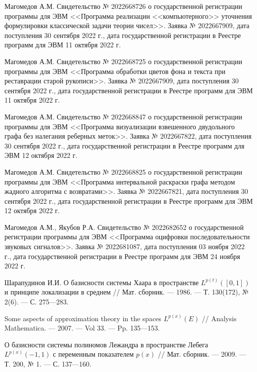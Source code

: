 \begin{thebibliography}{111}
Магомедов А.М. 
Свидетельство № 2022668726 о государственной регистрации программы для ЭВМ <<Программа реализации <<компьютерного>> уточнения формулировки классической задачи теории чисел>>. Заявка № 2022667909, дата поступления 30 сентября 2022 г., дата государственной регистрации в Реестре программ для ЭВМ 11 октября 2022 г.

Магомедов А.М. 
Свидетельство № 2022668725 о государственной регистрации программы для ЭВМ <<Программа обработки цветов фона и текста при реставрации старой рукописи>>. Заявка № 2022667909, дата поступления 30 сентября 2022 г., дата государственной регистрации в Реестре программ для ЭВМ 11 октября 2022 г.

Магомедов А.М. 
Свидетельство № 2022668847 о государственной регистрации программы для ЭВМ <<Программа визуализации взвешенного двудольного графа без налегания реберных меток>>. Заявка № 2022667822, дата поступления 30 сентября 2022 г., дата государственной регистрации в Реестре программ для ЭВМ 12 октября 2022 г. 

Магомедов А.М. 
Свидетельство № 2022668825 о государственной регистрации программы для ЭВМ <<Программа интервальной раскраски графа методом жадного алгоритма с возвратами>>.
Заявка № 2022667821, дата поступления 30 сентября 2022 г., дата государственной регистрации в Реестре программ для ЭВМ 12 октября 2022 г. 
 
Магомедов А.М., Якубов Р.А. 
Свидетельство № 2022682652 о государственной регистрации программы для ЭВМ <<Программа оцифровки последовательности звуковых сигналов>>.
Заявка № 2022681087, дата поступления 03 ноября 2022 г., дата государственной регистрации в Реестре программ для ЭВМ 24 ноября 2022 г.



Шарапудинов И.И.
О базисности системы Хаара в пространстве $L^{p(t)}([0,1])$ и принципе локализации в среднем
//
Мат. сборник.
--- 1986.
--- Т. 130(172), № 2(6).
--- С. 275---283.

Some aspects of approximation theory in the spaces $L^{p(x)}(E)$
//
Analysis Mathematica.
--- 2007.
--- Vol 33.
--- Pp. 135---153.

О базисности системы полиномов Лежандра в пространстве Лебега $L^{p(x)}(-1,1)$ с переменным показателем $p(x)$
//
Мат. сборник.
--- 2009.
--- Т. 200, № 1.
--- С. 137---160.


\end{thebibliography}
